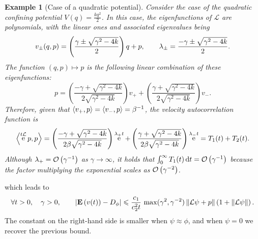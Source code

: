 \documentclass[11pt,a4paper]{article}
\DeclareMathOperator{\e}{e}
\newcommand{\expect}[0]{\mathbf{E}}
\renewcommand{\d}{\mathrm d}
\theoremstyle{plain}
\newtheorem{example}{Example}[section]
\numberwithin{equation}{section}
\renewcommand{\leq}{\leqslant}
\begin{document}
\begin{example}
    [Case of a quadratic potential]
    Consider the case of the quadratic confining potential $V(q) = \frac{k q^2}{2}$.
    In this case, the eigenfunctions of $\mathcal L$ are polynomials,
    with the linear ones and associated eigenvalues being
    \[
        v_{\pm}(q, p) =
        \left( \frac{\gamma \pm \sqrt{\gamma^2 - 4k}}{2} \right) q + p, \\
        \qquad
        \lambda_{\pm} = \frac{- \gamma \pm \sqrt{\gamma^2 - 4k}}{2}.
    \]
    The function $(q, p) \mapsto p$ is the following linear combination of these eigenfunctions:
    \[
        p =
        \left( \frac{-\gamma + \sqrt{\gamma^2 - 4k}}{2 \sqrt{\gamma^2 - 4k}} \right) v_+
        + \left( \frac{\gamma + \sqrt{\gamma^2 - 4k}}{2 \sqrt{\gamma^2 - 4k}} \right) v_-.
    \]
    Therefore, given that $\ip{v_+}{p} = \ip{v_-}{p} = \beta^{-1}$,
    the velocity autocorrelation function is
    \[
        \ip{\e^{t \mathcal L}p}{p} =
        \left( \frac{-\gamma + \sqrt{\gamma^2 - 4k}}{2 \beta \sqrt{\gamma^2 - 4k}} \right) \e^{\lambda_+ t} +
        \left( \frac{\gamma + \sqrt{\gamma^2 - 4k}}{2 \beta \sqrt{\gamma^2 - 4k}} \right) \e^{\lambda_- t} = T_1(t) + T_2(t).
    \]
    Although $\lambda_+ = \bigo {\gamma^{-1}}$ as $\gamma \to \infty$,
    it holds that $\int_{0}^{\infty} T_1(t) \, \d t = \bigo{\gamma^{-1}}$
    because the factor multiplying the exponential scales as $\bigo {\gamma^{-2}}$.
\end{example}


which leads to
\begin{align*}
    \forall t > 0, \quad \gamma > 0, \qquad
    \abs{\expect \left( v(t) \right) - D_{\phi}}
    \leq \frac{c_1}{c_2^2 t} \, \max(\gamma^2, \gamma^{-2}) \norm{\mathcal L\psi + p}  \left(1 + \norm{\mathcal L \psi} \right).
\end{align*}
The constant on the right-hand side is smaller when $\psi \approx \phi$,
and when $\psi = 0$ we recover the previous bound.
\end{document}
